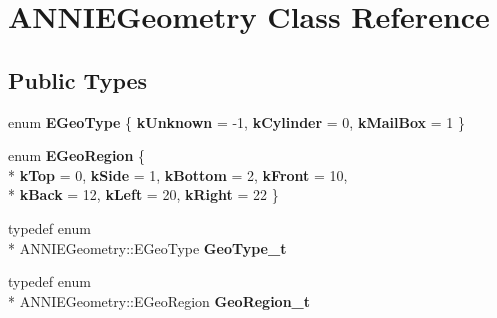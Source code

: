 \hypertarget{classANNIEGeometry}{\section{A\-N\-N\-I\-E\-Geometry Class Reference}
\label{classANNIEGeometry}
}
\subsection*{Public Types}
\begin{DoxyCompactItemize}
\item 
enum {\bfseries E\-Geo\-Type} \{ {\bfseries k\-Unknown} = -\/1, 
{\bfseries k\-Cylinder} = 0, 
{\bfseries k\-Mail\-Box} = 1
 \}
\item 
enum {\bfseries E\-Geo\-Region} \{ \\*
{\bfseries k\-Top} = 0, 
{\bfseries k\-Side} = 1, 
{\bfseries k\-Bottom} = 2, 
{\bfseries k\-Front} = 10, 
\\*
{\bfseries k\-Back} = 12, 
{\bfseries k\-Left} = 20, 
{\bfseries k\-Right} = 22
 \}
\item 
\hypertarget{classANNIEGeometry_ab5d29d11590e8129e6690899d0f84584}{typedef enum \\*
A\-N\-N\-I\-E\-Geometry\-::\-E\-Geo\-Type {\bfseries Geo\-Type\-\_\-t}}\label{classANNIEGeometry_ab5d29d11590e8129e6690899d0f84584}

\item 
\hypertarget{classANNIEGeometry_acf5083108f2f5a2d8ee98fe5aaa6e596}{typedef enum \\*
A\-N\-N\-I\-E\-Geometry\-::\-E\-Geo\-Region {\bfseries Geo\-Region\-\_\-t}}\label{classANNIEGeometry_acf5083108f2f5a2d8ee98fe5aaa6e596}

\end{DoxyCompactItemize}
